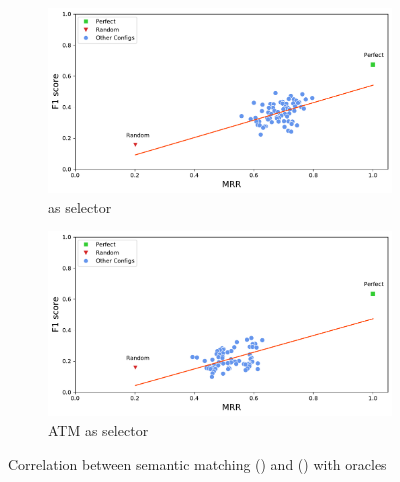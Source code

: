 \begin{figure}[H]
	\centering
	\begin{subfigure}{.5\textwidth}
		\centering
		\includegraphics[width=1\linewidth]{images/MRR_craftdroid_all_oracle_included.pdf}
		\caption{\craftdroid as selector}
		\label{fig:MRR_craftdroid_all_oracle_full}
	\end{subfigure}%
	\begin{subfigure}{.5\textwidth}
		\centering
		\includegraphics[width=1\linewidth]{images/MRR_atm_atm_oracle_included_passfree.pdf}
		\caption{ ATM as selector}
		\label{fig:MRR_atm_atm_oracle_passfree_full.pdf}
	\end{subfigure}
	\caption{Correlation between semantic matching (\mrr) and \testreuse (\fscore) with oracles}
	\label{fig:MRR-F1-scatter}
\end{figure}
